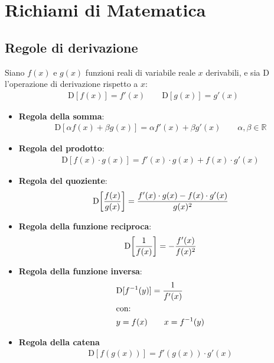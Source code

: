 
\chapter{Richiami di Matematica} %
\label{cha:matematica}

\section{Regole di derivazione} %
\label{sec:regole_di_derivazione}

Siano $f(x)$ e $g(x)$ funzioni reali di variabile reale $x$ derivabili, e sia $\mathrm{D}$ l'operazione di derivazione rispetto a $x$:
\begin{align*}
    \mathrm{D}[f(x)]=f'(x) \qquad \mathrm{D}[g(x)]=g'(x)
\end{align*}
\begin{itemize}
    \item \textbf{Regola della somma}:
    \begin{align*}
        \mathrm{D}[\alpha f(x)+ \beta g(x)] = \alpha f'(x) + \beta g'(x) \qquad \alpha, \beta \in \mathbb{R}
    \end{align*}
    \item \textbf{Regola del prodotto}:
    \begin{align*}
        \mathrm{D} [ {f(x) \cdot g(x)}] = f'(x) \cdot g(x) + f(x) \cdot g'(x) 
    \end{align*}
    \item \textbf{Regola del quoziente}:
    \begin{align*}
        \mathrm{D}\! \left[ {f(x) \over g(x)} \right] = { f'(x)  \cdot g(x) - f(x) \cdot g'(x) \over g(x)^2}
    \end{align*}
    \item \textbf{Regola della funzione reciproca}:
    \begin{align*}
        \mathrm{D}\! \left[ {1 \over f(x)} \right] = -{f'(x) \over f(x)^2} 
    \end{align*}
    \item \textbf{Regola della funzione inversa}:
    \begin{align*}
        &\mathrm{D}[f^{-1}(y)]  =  {1 \over f'(x)} \\
        &\text{con:} \\
        &y = {f(x)} \qquad x = {f^{-1}(y)}
    \end{align*}
    \item \textbf{Regola della catena}
    \begin{align*}
        \mathrm{D} \left[ f \left( g(x) \right) \right] = f' \left( g(x) \right) \cdot g'(x) 
    \end{align*}
\end{itemize}

